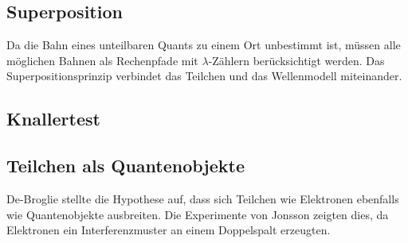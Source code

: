 \documentclass[a4paper]{article}
\begin{document}
		\subsection{Superposition}
			Da die Bahn eines unteilbaren Quants zu einem Ort unbestimmt ist, müssen alle möglichen Bahnen als Rechenpfade mit $\lambda$-Zählern berücksichtigt werden. Das Superpositionsprinzip verbindet das Teilchen und das Wellenmodell miteinander.
		\subsection{Knallertest}%
		\subsection{Teilchen als Quantenobjekte}%
		De-Broglie stellte die Hypothese auf, dass sich Teilchen wie Elektronen ebenfalls wie Quantenobjekte ausbreiten. Die Experimente von Jonsson zeigten dies, da Elektronen ein Interferenzmuster an einem Doppelspalt erzeugten.
		
\end{document}
